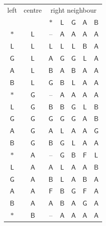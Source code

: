 \begin{table}[p]
\centering\small
\begin{tabular}{@{}cc|ccccc@{}}
\toprule
left & centre & \multicolumn{5}{c}{right neighbour}\\
 & & $\ast$ & $\mathsf{L}$ & $\mathsf{G}$ & $\mathsf{A}$ & $\mathsf{B}$\\
\midrule
$\ast$ & $\mathsf{L}$ & -- & $\mathsf{A}$ & $\mathsf{A}$ & $\mathsf{A}$ & $\mathsf{A}$\\
$\mathsf{L}$ & $\mathsf{L}$ & $\mathsf{L}$ & $\mathsf{L}$ & $\mathsf{L}$ & $\mathsf{B}$ & $\mathsf{A}$\\
$\mathsf{G}$ & $\mathsf{L}$ & $\mathsf{A}$ & $\mathsf{G}$ & $\mathsf{G}$ & $\mathsf{L}$ & $\mathsf{A}$\\
$\mathsf{A}$ & $\mathsf{L}$ & $\mathsf{B}$ & $\mathsf{A}$ & $\mathsf{B}$ & $\mathsf{A}$ & $\mathsf{A}$\\
$\mathsf{B}$ & $\mathsf{L}$ & $\mathsf{G}$ & $\mathsf{B}$ & $\mathsf{L}$ & $\mathsf{A}$ & $\mathsf{A}$\\
\midrule
$\ast$ & $\mathsf{G}$ & -- & $\mathsf{A}$ & $\mathsf{A}$ & $\mathsf{A}$ & $\mathsf{A}$\\
$\mathsf{L}$ & $\mathsf{G}$ & $\mathsf{B}$ & $\mathsf{B}$ & $\mathsf{G}$ & $\mathsf{L}$ & $\mathsf{B}$\\
$\mathsf{G}$ & $\mathsf{G}$ & $\mathsf{G}$ & $\mathsf{G}$ & $\mathsf{G}$ & $\mathsf{A}$ & $\mathsf{B}$\\
$\mathsf{A}$ & $\mathsf{G}$ & $\mathsf{A}$ & $\mathsf{L}$ & $\mathsf{A}$ & $\mathsf{A}$ & $\mathsf{G}$\\
$\mathsf{B}$ & $\mathsf{G}$ & $\mathsf{B}$ & $\mathsf{G}$ & $\mathsf{L}$ & $\mathsf{A}$ & $\mathsf{A}$\\
\midrule
$\ast$ & $\mathsf{A}$ & -- & $\mathsf{G}$ & $\mathsf{B}$ & $\mathsf{F}$ & $\mathsf{L}$\\
$\mathsf{L}$ & $\mathsf{A}$ & $\mathsf{A}$ & $\mathsf{L}$ & $\mathsf{A}$ & $\mathsf{A}$ & $\mathsf{B}$\\
$\mathsf{G}$ & $\mathsf{A}$ & $\mathsf{B}$ & $\mathsf{L}$ & $\mathsf{A}$ & $\mathsf{B}$ & $\mathsf{A}$\\
$\mathsf{A}$ & $\mathsf{A}$ & $\mathsf{F}$ & $\mathsf{B}$ & $\mathsf{G}$ & $\mathsf{F}$ & $\mathsf{A}$\\
$\mathsf{B}$ & $\mathsf{A}$ & $\mathsf{A}$ & $\mathsf{B}$ & $\mathsf{A}$ & $\mathsf{G}$ & $\mathsf{A}$\\
\midrule
$\ast$ & $\mathsf{B}$ & -- & $\mathsf{A}$ & $\mathsf{A}$ & $\mathsf{A}$ & $\mathsf{A}$\\

\end{tabular}
\end{table}
